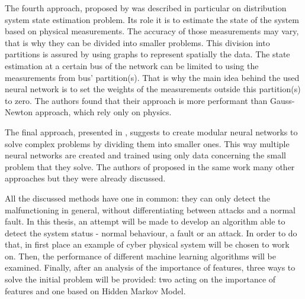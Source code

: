 The fourth approach, proposed by \cite{zamzam_physics-aware_2019} was described in particular on distribution system state estimation problem. Its role it is to estimate the state of the system based on physical measurements. The accuracy of those measurements may vary, that is why they can be divided into smaller problems. This division into partitions is assured by using graphs to represent spatially the data.  The state estimation at a certain bus of the network can be limited to using the measurements from bus' partition(s). That is why the main idea behind the used neural network is to set the weights of the measurements outside this partition(s) to zero. The authors found that their approach is more performant than Gauss-Newton approach, which rely only on physics.

The final approach, presented in \cite{karpatne_theory-guided_2017}, suggests to create modular neural networks to solve complex problems by dividing them into smaller ones. This way multiple neural networks are created and trained using only data concerning the small problem that they solve. The authors of \cite{karpatne_theory-guided_2017} proposed in the same work many other approaches but they were already discussed.

All the discussed methods have one in common: they can only detect the malfunctioning in general, without differentiating between attacks and a normal fault. In this thesis, an attempt will be made to develop an algorithm able to detect the system status - normal behaviour, a fault or an attack. In order to do that, in first place an example of cyber physical system will be chosen to work on. Then, the performance of different machine learning algorithms will be examined. Finally, after an analysis of the importance of features, three ways to solve the initial problem will be provided: two acting on the importance of features and one based on Hidden Markov Model.